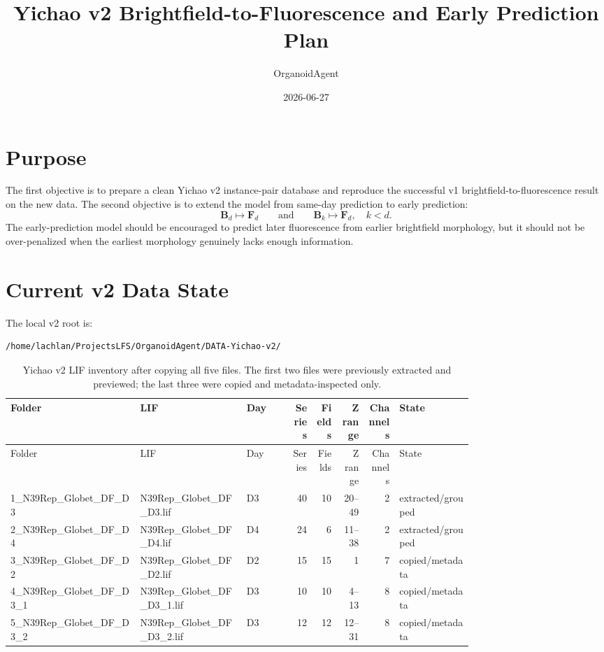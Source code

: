 \documentclass[11pt]{article}
\title{Yichao v2 Brightfield-to-Fluorescence and Early Prediction Plan}
\author{OrganoidAgent}
\date{2026-06-27}
\newcommand{\B}{\mathbf{B}}
\newcommand{\F}{\mathbf{F}}
\begin{document}
\maketitle
\tableofcontents

\section{Purpose}
The first objective is to prepare a clean Yichao v2 instance-pair database and reproduce the successful v1 brightfield-to-fluorescence result on the new data. The second objective is to extend the model from same-day prediction to early prediction:
\[
\B_{d} \mapsto \F_{d}
\qquad\text{and}\qquad
\B_{k} \mapsto \F_{d},\quad k<d .
\]
The early-prediction model should be encouraged to predict later fluorescence from earlier brightfield morphology, but it should not be over-penalized when the earliest morphology genuinely lacks enough information.

\section{Current v2 Data State}
The local v2 root is:
\begin{verbatim}
/home/lachlan/ProjectsLFS/OrganoidAgent/DATA-Yichao-v2/
\end{verbatim}

\begin{longtable}{@{}p{0.28\linewidth}p{0.23\linewidth}p{0.10\linewidth}rrrrp{0.16\linewidth}@{}}
\caption{Yichao v2 LIF inventory after copying all five files. The first two files were previously extracted and previewed; the last three were copied and metadata-inspected only.}\label{tab:v2-inventory}\\
\toprule
Folder & LIF & Day & Series & Fields & Z range & Channels & State\\
\midrule
\endfirsthead
\toprule
Folder & LIF & Day & Series & Fields & Z range & Channels & State\\
\midrule
\endhead
1\_N39Rep\_Globet\_DF\_D3 & N39Rep\_Globet\_DF\_D3.lif & D3 & 40 & 10 & 20--49 & 2 & extracted/grouped\\
2\_N39Rep\_Globet\_DF\_D4 & N39Rep\_Globet\_DF\_D4.lif & D4 & 24 & 6 & 11--38 & 2 & extracted/grouped\\
3\_N39Rep\_Globet\_DF\_D2 & N39Rep\_Globet\_DF\_D2.lif & D2 & 15 & 15 & 1 & 7 & copied/metadata\\
4\_N39Rep\_Globet\_DF\_D3\_1 & N39Rep\_Globet\_DF\_D3\_1.lif & D3 & 10 & 10 & 4--13 & 8 & copied/metadata\\
5\_N39Rep\_Globet\_DF\_D3\_2 & N39Rep\_Globet\_DF\_D3\_2.lif & D3 & 12 & 12 & 12--31 & 8 & copied/metadata\\
\bottomrule
\end{longtable}
\end{document}
